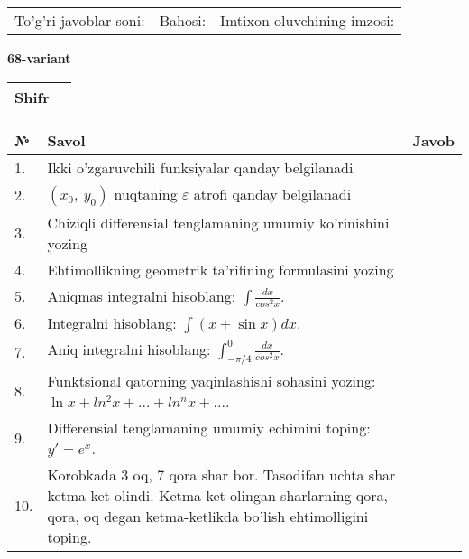 \documentclass{article}
\begin{document}
  \vspace{1cm}
  
  \begin{tabular}{lll}
  To'g'ri javoblar soni: \underline{\hspace{1.5cm}} & 
  Bahosi: \underline{\hspace{1.5cm}} & 
  Imtixon oluvchining imzosi: \underline{\hspace{2cm}} \\
  \end{tabular}
  
  \egroup
  
  \newpage
  
  
  \textbf{68-variant}\\
  
  \bgroup
  \def\arraystretch{1.6} %
  
  \begin{tabular}{|m{5.7cm}|m{9.5cm}|}
  \hline
  Shifr & \\
  \hline
  \end{tabular}
  
  \vspace{1cm}
  
  \begin{tabular}{|m{0.7cm}|m{10cm}|m{4cm}|}
  \hline
  № & Savol & Javob \\
  \hline
  1. & Ikki o'zgaruvchili funksiyalar qanday belgilanadi &  \\
  \hline
  2. & \((x_{0},\ y_{0})\) nuqtaning \(\varepsilon\) atrofi qanday belgilanadi &  \\
  \hline
  3. & Chiziqli differensial tenglamaning umumiy ko'rinishini yozing &  \\
  \hline
  4. & Ehtimollikning geometrik ta'rifining formulasini yozing &  \\
  \hline
  5. & Aniqmas integralni hisoblang: \(\int \frac{dx}{cos^{2}x}\). &  \\
  \hline
  6. & Integralni hisoblang: \(\int {(x + \sin x)dx}\). &  \\
  \hline
  7. & Aniq integralni hisoblang: \(\int_{- \pi/4}^{0}\frac{dx}{cos^{2}x}\). &  \\
  \hline
  8. & Funktsional qatorning yaqinlashishi sohasini yozing: \(\ln x + ln^{2}x + ... + ln^{n}x + ...\). &  \\
  \hline
  9. & Differensial tenglamaning umumiy echimini toping: \(y' = e^{x}\). &  \\
  \hline
  10. & Korobkada 3 oq, 7 qora shar bor. Tasodifan uchta shar ketma-ket olindi. Ketma-ket olingan sharlarning qora, qora, oq degan ketma-ketlikda bo'lish ehtimolligini toping. &  \\
  \hline
  \end{tabular}
  
\end{document}

